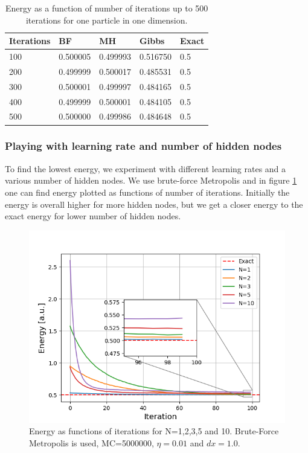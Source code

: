\documentclass[norsk,a4paper,12pt]{article}
\begin{document}
\begin{table} [H]
	\caption{Energy as a function of number of iterations up to 500 iterations for one particle in one dimension. \vspace{2mm}}
	\begin{tabularx}{\textwidth}{X|XXXX} \hline\hline
		\label{tab:energies1P1D}
		Iterations & BF & MH & Gibbs & Exact \\ \hline
				100 & 0.500005 & 0.499993 & 0.516750 & 0.5 \\
				200 & 0.499999 & 0.500017 & 0.485531 & 0.5 \\
				300 & 0.500001 & 0.499997 & 0.484165 & 0.5 \\
				400 & 0.499999 & 0.500001 & 0.484105 & 0.5 \\
				500 & 0.500000 & 0.499986 & 0.484648 & 0.5 \\ \hline
	\end{tabularx}
\end{table}

\subsubsection{Playing with learning rate and number of hidden nodes}
To find the lowest energy, we experiment with different learning rates and a various number of hidden nodes. We use brute-force Metropolis and in figure \ref{fig:compare_nodes} one can find energy plotted as  functions of number of iterations. Initially the energy is overall higher for more hidden nodes, but we get a closer energy to the exact energy for lower number of hidden nodes. 

 \begin{figure} [H]
 	\centering
 	\includegraphics[scale=0.8]{plots/energy_compare_nodes.png}
 	\caption{Energy as functions of iterations for N=1,2,3,5 and 10. Brute-Force Metropolis is used, MC=5000000, $\eta=0.01$ and $dx=1.0$.}
 	\label{fig:compare_nodes}
 \end{figure}
 
\end{document}
